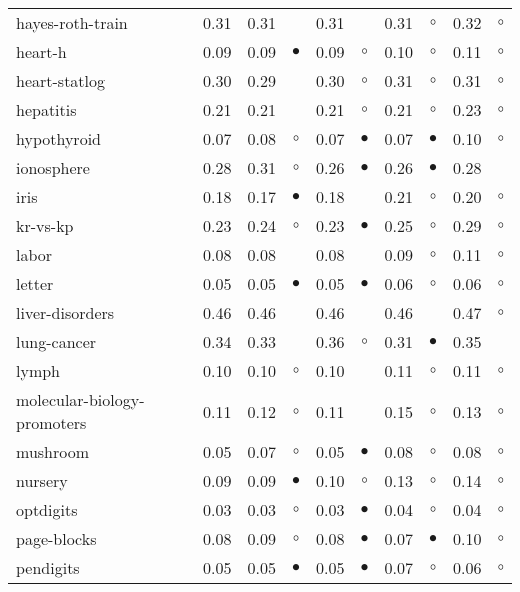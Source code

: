 \begin{table}[H]
{\begin{tabular}{lrr@{\hspace{0.1cm}}cr@{\hspace{0.1cm}}cr@{\hspace{0.1cm}}cr@{\hspace{0.1cm}}c}
hayes-roth-train & 0.31 & 0.31 &            & 0.31 &            & 0.31 &   $\circ$ & 0.32 &   $\circ$\\
heart-h & 0.09 & 0.09 &  $\bullet$ & 0.09 &    $\circ$ & 0.10 &   $\circ$ & 0.11 &   $\circ$\\
heart-statlog & 0.30 & 0.29 &            & 0.30 &    $\circ$ & 0.31 &   $\circ$ & 0.31 &   $\circ$\\
hepatitis & 0.21 & 0.21 &            & 0.21 &    $\circ$ & 0.21 &   $\circ$ & 0.23 &   $\circ$\\
hypothyroid & 0.07 & 0.08 &    $\circ$ & 0.07 &  $\bullet$ & 0.07 & $\bullet$ & 0.10 &   $\circ$\\
ionosphere & 0.28 & 0.31 &    $\circ$ & 0.26 &  $\bullet$ & 0.26 & $\bullet$ & 0.28 &          \\
iris & 0.18 & 0.17 &  $\bullet$ & 0.18 &            & 0.21 &   $\circ$ & 0.20 &   $\circ$\\
kr-vs-kp & 0.23 & 0.24 &    $\circ$ & 0.23 &  $\bullet$ & 0.25 &   $\circ$ & 0.29 &   $\circ$\\
labor & 0.08 & 0.08 &            & 0.08 &            & 0.09 &   $\circ$ & 0.11 &   $\circ$\\
letter & 0.05 & 0.05 &  $\bullet$ & 0.05 &  $\bullet$ & 0.06 &   $\circ$ & 0.06 &   $\circ$\\
liver-disorders & 0.46 & 0.46 &            & 0.46 &            & 0.46 &           & 0.47 &   $\circ$\\
lung-cancer & 0.34 & 0.33 &            & 0.36 &    $\circ$ & 0.31 & $\bullet$ & 0.35 &          \\
lymph & 0.10 & 0.10 &    $\circ$ & 0.10 &            & 0.11 &   $\circ$ & 0.11 &   $\circ$\\
molecular-biology-promoters & 0.11 & 0.12 &    $\circ$ & 0.11 &            & 0.15 &   $\circ$ & 0.13 &   $\circ$\\
mushroom & 0.05 & 0.07 &    $\circ$ & 0.05 &  $\bullet$ & 0.08 &   $\circ$ & 0.08 &   $\circ$\\
nursery & 0.09 & 0.09 &  $\bullet$ & 0.10 &    $\circ$ & 0.13 &   $\circ$ & 0.14 &   $\circ$\\
optdigits & 0.03 & 0.03 &    $\circ$ & 0.03 &  $\bullet$ & 0.04 &   $\circ$ & 0.04 &   $\circ$\\
page-blocks & 0.08 & 0.09 &    $\circ$ & 0.08 &  $\bullet$ & 0.07 & $\bullet$ & 0.10 &   $\circ$\\
pendigits & 0.05 & 0.05 &  $\bullet$ & 0.05 &  $\bullet$ & 0.07 &   $\circ$ & 0.06 &   $\circ$\\

\end{tabular}}
\end{table}
